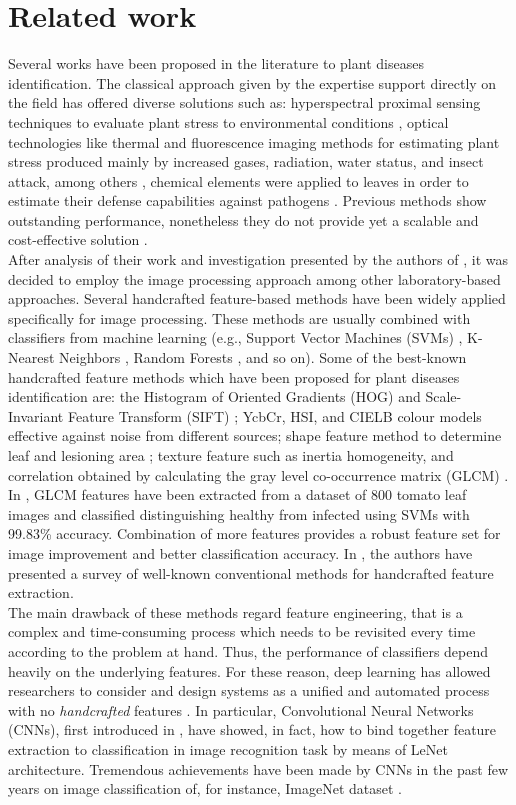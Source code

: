\section{Related work}
Several works have been proposed in the literature to plant diseases identification. The classical approach given by the expertise support directly on the field has offered diverse solutions such as: hyperspectral proximal sensing techniques to evaluate plant stress to environmental conditions \cite{ref14}, optical technologies like thermal and fluorescence imaging methods for estimating plant stress produced mainly by increased gases, radiation, water status, and insect attack, among others \cite{ref15}, chemical elements were applied to leaves in order to estimate their defense capabilities against pathogens \cite{ref16}. Previous methods show outstanding performance, nonetheless they do not provide yet a scalable and cost-effective solution \cite{ref17}.
\\\indent
After analysis of their work and investigation presented by the authors of \cite{ref18, ref19}, it was decided to employ the image processing approach among other laboratory-based approaches. Several handcrafted feature-based methods have been widely applied specifically for image processing. These methods are usually combined with classifiers from machine learning (e.g., Support Vector Machines (SVMs) \cite{ref24}, K-Nearest Neighbors \cite{ref27}, Random Forests \cite{ref25}, and so on). Some of the best-known handcrafted feature methods which have been proposed for plant diseases identification are: the Histogram of Oriented Gradients (HOG) \cite{ref20} and Scale-Invariant Feature Transform (SIFT) \cite{ref21}; YcbCr, HSI, and CIELB colour models \cite{ref22} effective against noise from different sources; shape feature method to determine leaf and lesioning area \cite{ref23}; texture feature such as inertia homogeneity, and correlation obtained by calculating the gray level co-occurrence matrix (GLCM) \cite{ref}. In \cite{ref}, GLCM features have been extracted from a dataset of 800 tomato leaf images and classified distinguishing healthy from infected using SVMs with 99.83\% accuracy. Combination of more features provides a robust feature set for image improvement and better classification accuracy. In \cite{ref28}, the authors have presented a survey of well-known conventional methods for handcrafted feature extraction.
\\\indent
The main drawback of these methods regard feature engineering, that is a complex and time-consuming process which needs to be revisited every time according to the problem at hand. Thus, the performance of classifiers depend heavily on the underlying features. For these reason, deep learning has allowed researchers to consider and design systems as a unified and automated process with no \emph{handcrafted} features \cite{ref29}. In particular, Convolutional Neural Networks (CNNs), first introduced in \cite{ref30}, have showed, in fact, how to bind together feature extraction to classification in image recognition task by means of LeNet architecture. Tremendous achievements have been made by CNNs in the past few years on image classification of, for instance, ImageNet dataset \cite{Krizhevsky}.
